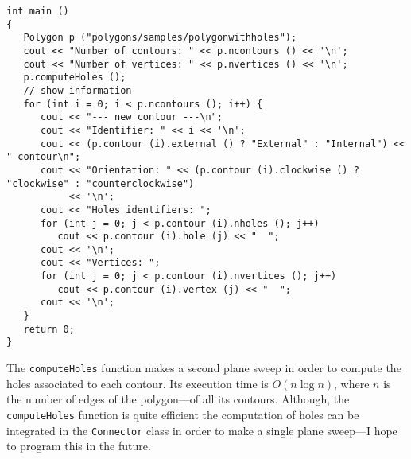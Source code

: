 \documentclass[a4paper]{article}
\begin{document}
\begin{lstlisting}
int main ()
{
   Polygon p ("polygons/samples/polygonwithholes");
   cout << "Number of contours: " << p.ncontours () << '\n';
   cout << "Number of vertices: " << p.nvertices () << '\n';
   p.computeHoles ();
   // show information
   for (int i = 0; i < p.ncontours (); i++) {
      cout << "--- new contour ---\n";
      cout << "Identifier: " << i << '\n';
      cout << (p.contour (i).external () ? "External" : "Internal") << " contour\n";
      cout << "Orientation: " << (p.contour (i).clockwise () ? "clockwise" : "counterclockwise") 
           << '\n';
      cout << "Holes identifiers: ";
      for (int j = 0; j < p.contour (i).nholes (); j++)
         cout << p.contour (i).hole (j) << "  ";
      cout << '\n';
      cout << "Vertices: ";
      for (int j = 0; j < p.contour (i).nvertices (); j++)
         cout << p.contour (i).vertex (j) << "  ";
      cout << '\n';
   }
   return 0;
}
\end{lstlisting}

The \lstinline+computeHoles+ function makes a second plane sweep in order to compute the holes associated to each contour. Its execution time is $O(n \log n)$, where $n$
is the number of edges of the polygon---of all its contours. Although, the \lstinline+computeHoles+ function is quite efficient the computation of holes can be
integrated in the \lstinline+Connector+ class in order to make a single plane sweep---I hope to program this in the future.
\end{document}

